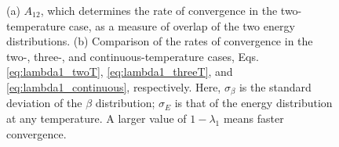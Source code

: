 \documentclass{gMOS2e}
\begin{document}
\begin{figure}[h]
\begin{center}
  \caption{\label{fig:gausconv}
    (a) $A_{12}$,
    which determines the rate of convergence
    in the two-temperature case,
    as a measure of overlap
    of the two energy distributions.
    (b) Comparison of the rates of convergence
    in the two-, three-,
    and continuous-temperature cases,
    Eqs. \eqref{eq:lambda1_twoT},
    \eqref{eq:lambda1_threeT},
    and
    \eqref{eq:lambda1_continuous},
    respectively.
    Here,
    $\sigma_\beta$
    is the standard deviation of the $\beta$ distribution;
    $\sigma_E$
    is that of the energy distribution
    at any temperature.
    A larger value of $1 - \lambda_1$
    means faster convergence.
  }
\end{center}
\end{figure}
\end{document}
